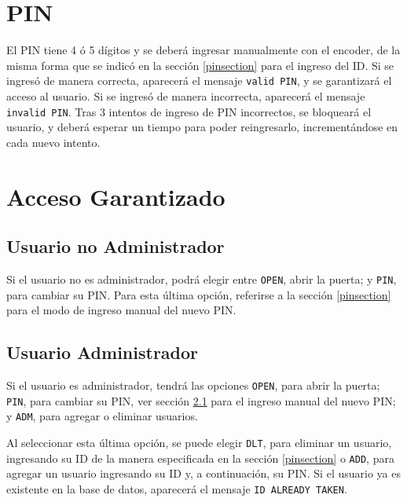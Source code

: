  \section{PIN}
 El PIN tiene 4 ó 5 dígitos y se deberá ingresar manualmente con el encoder, de la misma forma 
 que se indicó en la sección \ref{pinsection} para el ingreso del ID. 
 Si se ingresó de manera correcta, aparecerá el mensaje \texttt{valid PIN}, 
 y se garantizará el acceso al usuario.
Si se ingresó de manera incorrecta, aparecerá el mensaje \texttt{invalid PIN}.
Tras 3 intentos de ingreso de PIN incorrectos, se bloqueará el usuario, 
y deberá esperar un tiempo para poder reingresarlo, incrementándose en cada nuevo intento.

\section{Acceso Garantizado}
\subsection{Usuario no Administrador}
\label{noadminmenu}
Si el usuario no es administrador, podrá elegir entre \texttt{OPEN}, abrir la puerta; y \texttt{PIN},
para cambiar su PIN. Para esta última opción, referirse a la sección \ref{pinsection} para 
el modo de ingreso manual del nuevo PIN.
\subsection{Usuario Administrador}
 \label{adminmenu}
 Si el usuario es administrador, tendrá las opciones \texttt{OPEN}, para abrir la puerta; \texttt{PIN}, 
 para cambiar su PIN, ver sección \ref{noadminmenu} para el ingreso manual del nuevo PIN;
  y \texttt{ADM}, para agregar o eliminar usuarios.\par
  Al seleccionar esta última opción, se puede elegir \texttt{DLT}, para eliminar un usuario, ingresando su ID
  de la manera especificada en la sección \ref{pinsection} o \texttt{ADD}, para agregar un usuario 
  ingresando su ID y, a continuación, su PIN. Si el usuario ya es existente en la base de datos, 
  aparecerá el mensaje \texttt{ID ALREADY TAKEN}.




